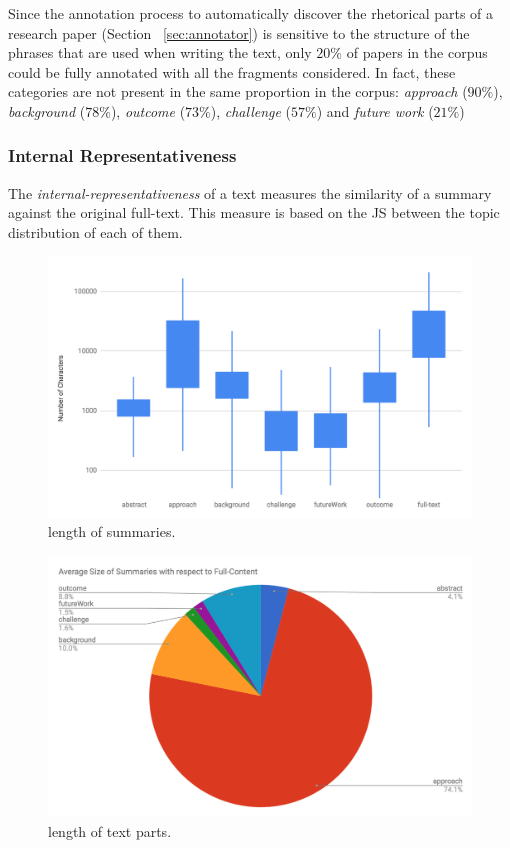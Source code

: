 Since the annotation process to automatically discover the rhetorical parts of a research paper (Section ~\ref{sec:annotator}) is sensitive to the structure of the phrases that are used when writing the text, only $20\%$ of papers in the corpus could be fully annotated with all the fragments considered. In fact, these categories are not present in the same proportion in the corpus: \textit{approach} ($90\%$), \textit{background} ($78\%$), \textit{outcome} ($73\%$), \textit{challenge} ($57\%$) and \textit{future work} ($21\%$)

\subsubsection{Internal Representativeness}

The \textit{internal-representativeness} of a text measures the similarity of a summary against the original full-text. This measure is based on the JS between the topic distribution of each of them. 

\begin{figure}[!htbp]
  \center
  \includegraphics[scale=0.4]{size.png}
  \caption{length of summaries.}
  \label{fig:size}
\end{figure}

\begin{figure}[!htbp]
  \center
  \includegraphics[scale=0.4]{relativeSize.png}
  \caption{length of text parts.}
  \label{fig:relativeSize}
\end{figure}

